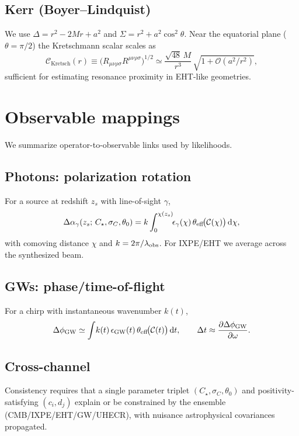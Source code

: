 \documentclass[%
 reprint,
 amsmath,amssymb,
 aps,
 pra,
 longbibliography,
 nofootinbib
]{revtex4-2}
\newcommand{\Ord}[1]{\mathcal{O}\!\left(#1\right)}
\newcommand{\dd}{\mathrm{d}}
\begin{document}
\subsection{Kerr (Boyer–Lindquist)}
\label{sec:kerr}
We use $\Delta=r^2-2Mr+a^2$ and $\Sigma=r^2+a^2\cos^2\theta$.
Near the equatorial plane ($\theta=\pi/2$) the Kretschmann scalar scales as
\begin{equation}
\mathcal{C}_\text{Kretsch}(r)\equiv
\big(R_{\mu\nu\rho\sigma}R^{\mu\nu\rho\sigma}\big)^{1/2}
\simeq \frac{\sqrt{48}\,M}{r^3}\,
\sqrt{1+\Ord{a^2/r^2}},
\end{equation}
sufficient for estimating resonance proximity in EHT-like geometries.

\section{Observable mappings}
\label{sec:obs}
We summarize operator-to-observable links used by likelihoods.

\subsection{Photons: polarization rotation}
\label{sec:phot-obs}
For a source at redshift $z_s$ with line-of-sight $\gamma$,
\begin{equation}
\Delta\alpha_\gamma(z_s;\,C_\star,\sigma_C,\theta_0)
= k \int_0^{\chi(z_s)}\!\!\epsilon_\gamma(\chi)\,
\theta_{\rm eff}\!\big(\mathcal{C}(\chi)\big)\,\dd\chi,
\end{equation}
with comoving distance $\chi$ and $k=2\pi/\lambda_{\rm obs}$. For IXPE/EHT we average across the synthesized beam.

\subsection{GWs: phase/time-of-flight}
\label{sec:gw-obs}
For a chirp with instantaneous wavenumber $k(t)$,
\begin{equation}
\Delta\phi_{\rm GW} \simeq
\int \!k(t)\,\epsilon_{\rm GW}(t)\,
\theta_{\rm eff}\!\big(\mathcal{C}(t)\big)\,\dd t,
\qquad
\Delta t \approx \frac{\partial \Delta\phi_{\rm GW}}{\partial \omega}.
\end{equation}

\subsection{Cross-channel}
\label{sec:cross}
Consistency requires that a single parameter triplet $(C_\star,\sigma_C,\theta_0)$ and positivity-satisfying $(c_i,d_j)$ explain or be constrained by the ensemble (CMB/IXPE/EHT/GW/UHECR), with nuisance astrophysical covariances propagated.
\end{document}
